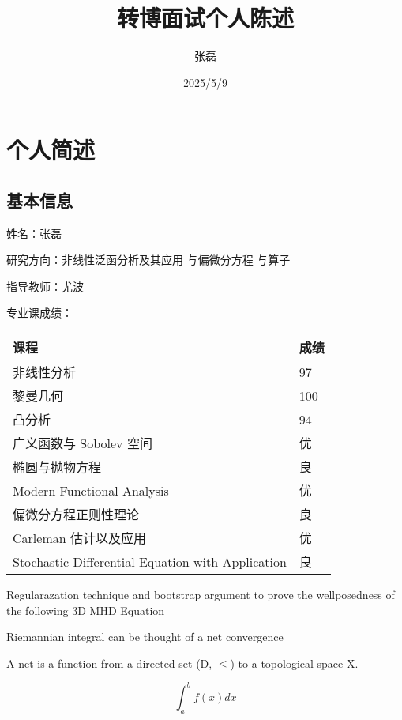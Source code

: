\documentclass{beamer}
\title{转博面试个人陈述}
\author{张磊}
\institute{西安交通大学数学学院}
\date{2025/5/9}
\begin{document}

\section{个人简述}
\subsection{基本信息}

\begin{frame}
姓名：张磊

研究方向：非线性泛函分析及其应用 与偏微分方程 与算子

指导教师：尤波

专业课成绩：
\begin{tabular}{|l|l|}

\hline 课程 & 成绩 \\
\hline 非线性分析 & 97\\
\hline  黎曼几何 & 100  \\
\hline 凸分析 & 94 \\
\hline 广义函数与 Sobolev 空间 & 优 \\
\hline 椭圆与抛物方程 & 良 \\
\hline Modern Functional Analysis & 优   \\
\hline 偏微分方程正则性理论 & 良  \\
\hline Carleman 估计以及应用 & 优 \\
\hline Stochastic Differential Equation with Application & 良 \\
\hline
\end{tabular}

\end{frame}

\begin{frame}
    Regularazation technique and bootstrap argument to prove the wellposedness
    of the following 3D MHD Equation

    Riemannian integral can be thought of a net convergence

    \begin{definition}
        A net is a function from a directed set (D, $\leq$) to a topological space
        X.
    \end{definition}
    \begin{equation}
        \int_{a}^{b}f(x)dx
    \end{equation}


\end{frame}
\end{document}
